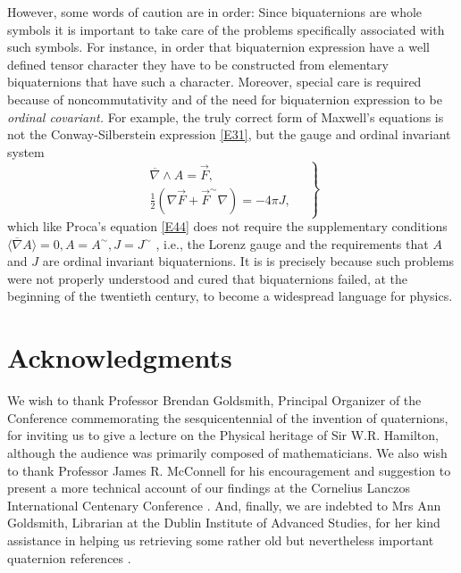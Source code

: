 \documentclass [12pt,a4paper      ]{article}
\newcommand{\CON}{\overline}          %
\newcommand{\vect}{\wedge}            %
\newcommand{\SCA}{\langle}            %
\newcommand{\LAR}{\rangle}            %
\newcommand{\REV}{\sim}               %
\begin{document}
\noindent However,  some words of caution are in order: Since biquaternions are whole symbols it is important to take care of the problems specifically associated with such symbols. For instance, in order that biquaternion expression have a well defined tensor character they have to be constructed from elementary biquaternions that have such a character.  Moreover, special care is required because of noncommutativity and of the need for biquaternion expression to be {\it ordinal covariant.}  For example, the truly correct form of Maxwell's equations is not the Conway-Silberstein expression \eqref{E31}, but the gauge and ordinal invariant system
%
\begin{equation}\label{E57}
\left.
\begin{array}{c}
\CON{\nabla} \vect A  =  \vec{F}, \\
\tfrac{1}{2} (\nabla \vec{F}  + \vec{F}^\REV \nabla) = -4 \pi  J,
\end{array}
\quad \right\}
\end{equation}
%
which like Proca's equation \eqref{E44} does not require the supplementary conditions $\SCA\CON{\nabla}A\LAR=0 , A=A^\REV , J=J^\REV$ , i.e., the Lorenz gauge and the requirements that $A$ and $J$ are ordinal invariant biquaternions.  It is is precisely because such problems were not properly understood and cured that biquaternions failed, at the beginning of the twentieth century, to become a widespread language for physics.



\section{Acknowledgments}
\label{ack:0}

     We  wish  to thank Professor  Brendan  Goldsmith,  Principal 
Organizer of the Conference commemorating the sesquicentennial of 
the  invention of quaternions,  for inviting us to give a lecture 
on  the  Physical heritage of Sir  W.R.  Hamilton,  although  the 
audience was primarily composed of mathematicians.  We also wish 
to thank Professor James R.  McConnell for his encouragement  and 
suggestion  to  present  a  more  technical  account  of  our 
findings   at  the  Cornelius  Lanczos  International   Centenary 
Conference \cite{R27}.  And, finally, we are  indebted to Mrs Ann Goldsmith, 
Librarian  at the Dublin Institute of Advanced Studies,  for  her 
kind  assistance  in helping us retrieving some  rather  old  but 
nevertheless important quaternion references \cite{R59}.
\end{document}
